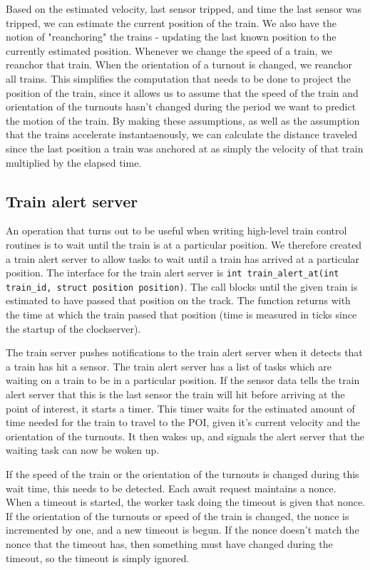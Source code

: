 \documentclass[titlepage]{article}
\begin{document}
Based on the estimated velocity, last sensor tripped, and time the last sensor
was tripped, we can estimate the current position of the train.
We also have the notion of "reanchoring" the trains - updating the last
known position to the currently estimated position.
Whenever we change the speed of a train, we reanchor that train.
When the orientation of a turnout is changed, we reanchor all trains.
This simplifies the computation that needs to be done to project the position
of the train, since it allows us to assume that the speed of the train and
orientation of the turnouts hasn't changed during the period we want to predict
the motion of the train.
By making these assumptions, as well as the assumption that the trains accelerate
instantaenously, we can calculate the distance traveled since the last position
a train was anchored at as simply the velocity of that train multiplied by
the elapsed time.

\subsection{Train alert server}
An operation that turns out to be useful when writing high-level train control
routines is to wait until the train is at a particular position.
We therefore created a train alert server to allow tasks to wait until a train
has arrived at a particular position.
The interface for the train alert server is
\texttt{int train\_alert\_at(int train\_id, struct position position)}.
The call blocks until the given train is estimated to have passed that position
on the track.
The function returns with the time at which the train passed that position
(time is measured in ticks since the startup of the clockserver).

The train server pushes notifications to the train alert server when
it detects that a train has hit a sensor.
The train alert server has a list of tasks which are waiting on a train
to be in a particular position.
If the sensor data tells the train alert server that this is the last
sensor the train will hit before arriving at the point of interest,
it starts a timer.
This timer waits for the estimated amount of time needed for the train
to travel to the POI, given it's current velocity and the orientation
of the turnouts.
It then wakes up, and signals the alert server that the waiting task can
now be woken up.

If the speed of the train or the orientation of the turnouts is changed
during this wait time, this needs to be detected.
Each await request maintains a nonce.
When a timeout is started, the worker task doing the timeout is given
that nonce.
If the orientation of the turnouts or speed of the train is changed,
the nonce is incremented by one, and a new timeout is begun.
If the nonce doesn't match the nonce that the timeout has, then something
must have changed during the timeout, so the timeout is simply ignored.
\end{document}
